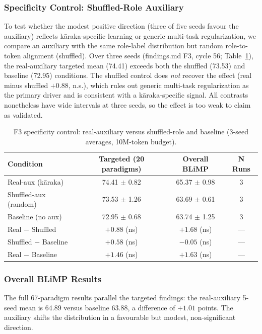 \subsubsection{Specificity Control: Shuffled-Role Auxiliary}

To test whether the modest positive direction (three of five seeds favour the auxiliary) reflects kāraka-specific learning or generic multi-task regularization, we compare an auxiliary with the same role-label distribution but random role-to-token alignment (shuffled). Over three seeds (findings.md F3, cycle 56; Table~\ref{tab:f3_specificity}), the real-auxiliary targeted mean (74.41) exceeds both the shuffled (73.53) and baseline (72.95) conditions. The shuffled control does \emph{not} recover the effect (real minus shuffled $+0.88$, n.s.), which rules out generic multi-task regularization as the primary driver and is consistent with a kāraka-specific signal. All contrasts nonetheless have wide intervals at three seeds, so the effect is too weak to claim as validated.

\begin{table}[t]
\centering
\caption{F3 specificity control: real-auxiliary versus shuffled-role and baseline (3-seed averages, 10M-token budget).}
\label{tab:f3_specificity}
{\small
\begin{tabular}{lccc}
\toprule
Condition & Targeted (20 paradigms) & Overall BLiMP & N Runs \\
\midrule
Real-aux (kāraka) & 74.41 \({\pm}\) 0.82 & 65.37 \({\pm}\) 0.98 & 3 \\
Shuffled-aux (random) & 73.53 \({\pm}\) 1.26 & 63.69 \({\pm}\) 0.61 & 3 \\
Baseline (no aux) & 72.95 \({\pm}\) 0.68 & 63.74 \({\pm}\) 1.25 & 3 \\
\midrule
Real $-$ Shuffled & $+0.88$ (ns) & $+1.68$ (ns) & — \\
Shuffled $-$ Baseline & $+0.58$ (ns) & $-0.05$ (ns) & — \\
Real $-$ Baseline & $+1.46$ (ns) & $+1.63$ (ns) & — \\
\bottomrule
\end{tabular}
}
\end{table}

\subsubsection{Overall BLiMP Results}

The full 67-paradigm results parallel the targeted findings: the real-auxiliary 5-seed mean is 64.89 versus baseline 63.88, a difference of $+1.01$ points. The auxiliary shifts the distribution in a favourable but modest, non-significant direction.

